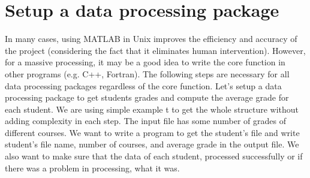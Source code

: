 \section{Setup a data processing package}

In many cases, using MATLAB in Unix improves the efficiency and accuracy of the project (considering the fact that it eliminates human intervention). However, for a massive processing, it may be a good idea to write the core function in other programs (e.g. C++, Fortran). The following steps are necessary for all data processing packages regardless of the core function. Let's setup a data processing package to get students grades and compute the average grade for each student. We are using simple example t to get the whole structure without adding complexity in each step. The input file has some number of grades of different courses. We want to write a program to get the student's file and write student's file name, number of courses, and average grade in the output file. We also want to make sure that the data of each student, processed successfully or if there was a problem in processing, what it was. \\






 


